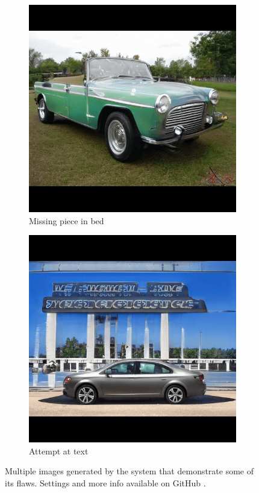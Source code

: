 \begin{figure}
\begin{subfigure}{.3\textwidth}
  \includegraphics[width=\textwidth]{images/missing_piece.png}
  \caption{Missing piece in bed}
  \label{fig:missingpiece}
\end{subfigure}
\hspace{.02\textwidth}
\begin{subfigure}{.3\textwidth}
  \centering
  \includegraphics[width=\textwidth]{images/text.png}
  \caption{Attempt at text}
  \label{fig:textattempt}
\end{subfigure}
\captionsetup{width=.85\linewidth}
\captionsetup{justification=centering}
\caption{Multiple images generated by the system that demonstrate some of its flaws. Settings and more info available on GitHub \citep{github_project}.}
\label{fig:challanging_angle}
\end{figure}

